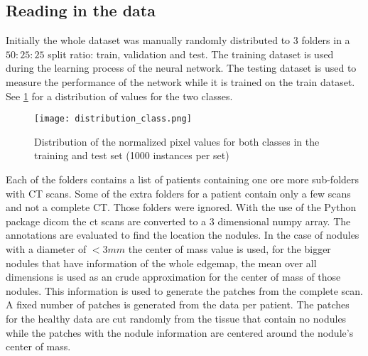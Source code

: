 \documentclass[../Thesis.tex]{subfiles}
\begin{document}
\subsection{Reading in the data}
Initially the whole dataset was manually randomly distributed to 3 folders in a $50:25:25$ split ratio: train, validation and test. The training dataset is used during the learning process of the neural network. The testing dataset is used to measure the performance of the network while it is trained on the train dataset. See \ref{fig:ttdist} for a distribution of values for the two classes. 
\begin{figure}
\texttt{[image: distribution\_class.png]}
\caption{Distribution of the normalized pixel values for both classes in the training and test set (1000 instances per set)}
\label{fig:ttdist}
\end{figure}
Each of the folders contains a list of patients containing one ore more sub-folders with CT scans. Some of the extra folders for a patient contain only a few scans and not a complete CT. Those folders were ignored. With the use of the Python package dicom \cite{mason2011t} the ct scans are converted to a 3 dimensional numpy array. The annotations are evaluated to find the location the nodules. In the case of nodules with a diameter of $<3mm$ the center of mass value is used, for the bigger nodules that have information of the whole edgemap, the mean over all dimensions is used as an crude approximation for the center of mass of those nodules. This information is used to generate the patches from the complete scan. A fixed number of patches is generated from the data per patient. The patches for the healthy data are cut randomly from the tissue that contain no nodules while the patches with the nodule information are centered around the nodule's center of mass.
\end{document}
